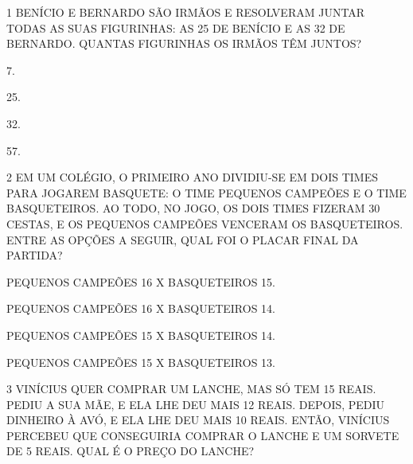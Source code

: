 
\num{1} BENÍCIO E BERNARDO SÃO IRMÃOS E RESOLVERAM JUNTAR TODAS AS
SUAS FIGURINHAS: AS 25 DE BENÍCIO E AS 32 DE BERNARDO. QUANTAS FIGURINHAS OS
IRMÃOS TÊM JUNTOS?

\begin{minipage}{.5\textwidth}
\begin{escolha}
\item
  7.
\item
  25.
\item
  32.
\item
  57.
\end{escolha}
\end{minipage}

\num{2} EM UM COLÉGIO, O PRIMEIRO ANO DIVIDIU-SE EM DOIS TIMES PARA JOGAREM BASQUETE: O TIME PEQUENOS CAMPEÕES E O TIME BASQUETEIROS. AO TODO, NO JOGO, OS DOIS TIMES FIZERAM 30 CESTAS, E OS PEQUENOS CAMPEÕES VENCERAM OS BASQUETEIROS. ENTRE AS OPÇÕES A SEGUIR, QUAL FOI O PLACAR FINAL DA PARTIDA?

\begin{escolha}
\item
  PEQUENOS CAMPEÕES 16 X BASQUETEIROS 15.
\item
  PEQUENOS CAMPEÕES 16 X BASQUETEIROS 14.
\item
  PEQUENOS CAMPEÕES 15 X BASQUETEIROS 14.
\item
  PEQUENOS CAMPEÕES 15 X BASQUETEIROS 13.
\end{escolha}



\num{3} VINÍCIUS QUER COMPRAR UM LANCHE, MAS SÓ TEM 15 REAIS. PEDIU A SUA MÃE, E
ELA LHE DEU MAIS 12 REAIS. DEPOIS, PEDIU DINHEIRO À AVÓ, E ELA
LHE DEU MAIS 10 REAIS. ENTÃO, VINÍCIUS PERCEBEU QUE CONSEGUIRIA COMPRAR O LANCHE E UM SORVETE DE 5 REAIS. QUAL É O PREÇO DO LANCHE?

